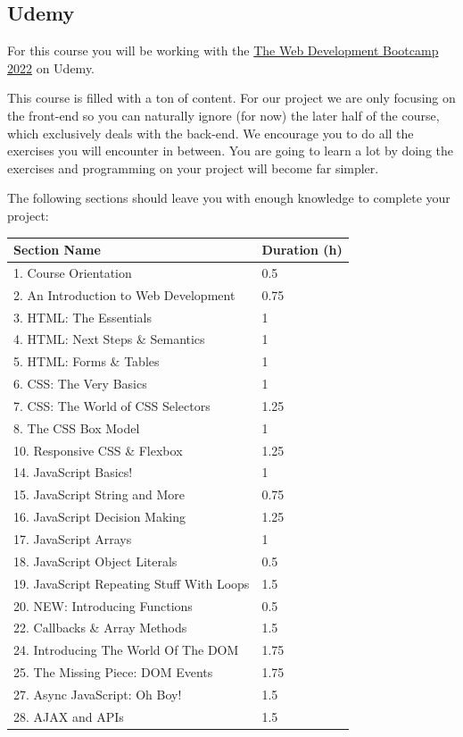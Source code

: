 \documentclass[
]{article}
\begin{document}
\hypertarget{udemy}{%
\subsection{Udemy}\label{udemy}}

For this course you will be working with the \href{https://www.udemy.com/course/the-web-developer-bootcamp/}{The Web Development Bootcamp 2022} on Udemy.

This course is filled with a ton of content. For our project we are only focusing on the front-end so you can naturally ignore (for now) the later half of the course, which exclusively deals with the back-end. We encourage you to do all the exercises you will encounter in between. You are going to learn a lot by doing the exercises and programming on your project will become far simpler.

The following sections should leave you with enough knowledge to complete your project:

\begin{longtable}[]{@{}ll@{}}
\toprule()
Section Name & Duration (h) \\
\midrule()
\endhead
1. Course Orientation & 0.5 \\
2. An Introduction to Web Development & 0.75 \\
3. HTML: The Essentials & 1 \\
4. HTML: Next Steps \& Semantics & 1 \\
5. HTML: Forms \& Tables & 1 \\
6. CSS: The Very Basics & 1 \\
7. CSS: The World of CSS Selectors & 1.25 \\
8. The CSS Box Model & 1 \\
10. Responsive CSS \& Flexbox & 1.25 \\
14. JavaScript Basics! & 1 \\
15. JavaScript String and More & 0.75 \\
16. JavaScript Decision Making & 1.25 \\
17. JavaScript Arrays & 1 \\
18. JavaScript Object Literals & 0.5 \\
19. JavaScript Repeating Stuff With Loops & 1.5 \\
20. NEW: Introducing Functions & 0.5 \\
22. Callbacks \& Array Methods & 1.5 \\
24. Introducing The World Of The DOM & 1.75 \\
25. The Missing Piece: DOM Events & 1.75 \\
27. Async JavaScript: Oh Boy! & 1.5 \\
28. AJAX and APIs & 1.5 \\
\bottomrule()
\end{longtable}
\end{document}
